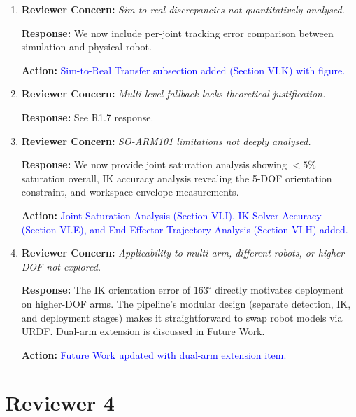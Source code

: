 \documentclass[11pt]{article}
\newcommand{\concern}[1]{\textbf{Reviewer Concern:} \textit{#1}}
\newcommand{\response}[1]{\textbf{Response:} #1}
\newcommand{\action}[1]{\textbf{Action:} \textcolor{blue}{#1}}
\begin{document}
\begin{enumerate}[label=\textbf{R3.\arabic*}]
\response{We now provide a comprehensive EMA ablation study across 7 alpha values, showing the smoothness--responsiveness trade-off.}

\action{EMA Smoothing Ablation subsection added (Section VI.G) with figure.}

\item \concern{Sim-to-real discrepancies not quantitatively analysed.}

\response{We now include per-joint tracking error comparison between simulation and physical robot.}

\action{Sim-to-Real Transfer subsection added (Section VI.K) with figure.}

\item \concern{Multi-level fallback lacks theoretical justification.}

\response{See R1.7 response.}

\item \concern{SO-ARM101 limitations not deeply analysed.}

\response{We now provide joint saturation analysis showing $<5\%$ saturation overall, IK accuracy analysis revealing the 5-DOF orientation constraint, and workspace envelope measurements.}

\action{Joint Saturation Analysis (Section VI.I), IK Solver Accuracy (Section VI.E), and End-Effector Trajectory Analysis (Section VI.H) added.}

\item \concern{Applicability to multi-arm, different robots, or higher-DOF not explored.}

\response{The IK orientation error of $163^{\circ}$ directly motivates deployment on higher-DOF arms. The pipeline's modular design (separate detection, IK, and deployment stages) makes it straightforward to swap robot models via URDF. Dual-arm extension is discussed in Future Work.}

\action{Future Work updated with dual-arm extension item.}

\end{enumerate}

\section*{Reviewer 4}
\end{document}

